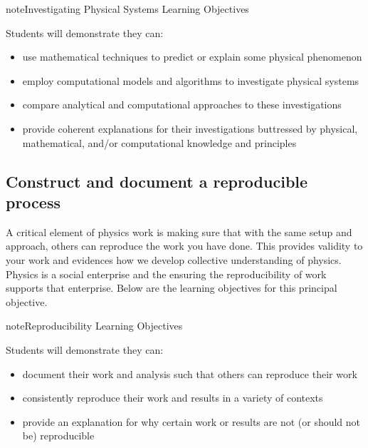 \documentclass[letterpaper,10pt,english]{jupyterBook}
\begin{document}
\begin{sphinxadmonition}{note}{Investigating Physical Systems Learning Objectives}

\sphinxAtStartPar
Students will demonstrate they can:
\begin{itemize}
\item {} 
\sphinxAtStartPar
use mathematical techniques to predict or explain some physical phenomenon

\item {} 
\sphinxAtStartPar
employ computational models and algorithms to investigate physical systems

\item {} 
\sphinxAtStartPar
compare analytical and computational approaches to these investigations

\item {} 
\sphinxAtStartPar
provide coherent explanations for their investigations buttressed by physical, mathematical, and/or computational knowledge and principles

\end{itemize}
\end{sphinxadmonition}


\subsection{Construct and document a reproducible process}
\label{\detokenize{content/0_course/goals:construct-and-document-a-reproducible-process}}
\sphinxAtStartPar
A critical element of physics work is making sure that with the same setup and approach, others can reproduce the work you have done. This provides validity to your work and evidences how we develop collective understanding of physics. Physics is a social enterprise and the ensuring the reproducibility of work supports that enterprise. Below are the learning objectives for this principal objective.

\begin{sphinxadmonition}{note}{Reproducibility Learning Objectives}

\sphinxAtStartPar
Students will demonstrate they can:
\begin{itemize}
\item {} 
\sphinxAtStartPar
document their work and analysis such that others can reproduce their work

\item {} 
\sphinxAtStartPar
consistently reproduce their work and results in a variety of contexts

\item {} 
\sphinxAtStartPar
provide an explanation for why certain work or results are not (or should not be) reproducible

\end{itemize}
\end{sphinxadmonition}
\end{document}
